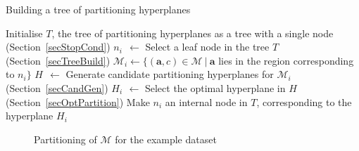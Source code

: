 \documentclass[a4paper,12pt]{report} %
\newcommand{\mcl}[1]{\mathcal{#1}}
\newcommand{\vect}[1]{\boldsymbol{#1}}
\begin{document}
\begin{algorithm}[p]
\caption{Building a tree of partitioning hyperplanes}
\label{algoTree} 
\begin{algorithmic}
\State Initialise $T$, the tree of partitioning hyperplanes as a tree with a single node
 \hfill (Section~\ref{secStopCond})
    \State $n_i ~~\gets$ Select a leaf node in the tree $T$ \hfill (Section~\ref{secTreeBuild})
    \State $\mcl{M}_i \gets \{ (\vect{a},c) \in \mcl{M} ~|~ \vect{a}$ 
        lies in the region corresponding to $n_i \}$
    \State $H ~~\gets$ Generate candidate partitioning hyperplanes for 
        $\mcl{M}_i$ \hfill (Section~\ref{secCandGen})
    \State $H_i \,~\gets$ Select the optimal hyperplane in $H$ \hfill (Section~\ref{secOptPartition})
    \State Make $n_i$ an internal node in $T$, corresponding 
        to the hyperplane $H_i$
\EndWhile
\end{algorithmic}
\end{algorithm}


\begin{figure}[p]
\begin{center}
\iftoggle{dotikzext}{\tikzsetnextfilename{eg-data/d23}}{}
\end{center}
\caption{Partitioning of $\mcl{M}$ for the example dataset}
\label{visMpart}
\end{figure}
\end{document}
